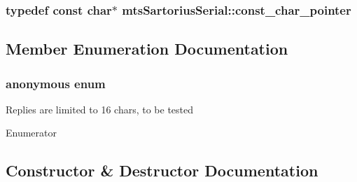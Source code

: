\subsubsection[{const\+\_\+char\+\_\+pointer}]{\setlength{\rightskip}{0pt plus 5cm}typedef const char$\ast$ {\bf mts\+Sartorius\+Serial\+::const\+\_\+char\+\_\+pointer}\hspace{0.3cm}{\ttfamily [protected]}}\label{classmts_sartorius_serial_a84eee50d0f43b06e6adac9ae20f4f02c}


\subsection{Member Enumeration Documentation}
\hypertarget{classmts_sartorius_serial_a14d6fa459e993354125cf4a0d9420000}{}\subsubsection[{anonymous enum}]{\setlength{\rightskip}{0pt plus 5cm}anonymous enum\hspace{0.3cm}{\ttfamily [protected]}}\label{classmts_sartorius_serial_a14d6fa459e993354125cf4a0d9420000}
Replies are limited to 16 chars, to be tested \begin{Desc}
\item[Enumerator]\par
\begin{description}
\item[{\em 
\hypertarget{classmts_sartorius_serial_a14d6fa459e993354125cf4a0d9420000a7a2c0b5e39b999002353c52f30f82d1f}{}B\+U\+F\+F\+E\+R\+\_\+\+S\+I\+Z\+E\label{classmts_sartorius_serial_a14d6fa459e993354125cf4a0d9420000a7a2c0b5e39b999002353c52f30f82d1f}
}]\end{description}
\end{Desc}


\subsection{Constructor \& Destructor Documentation}
\hypertarget{classmts_sartorius_serial_ab768cdb000bad4801243ddf1af876d27}{}
